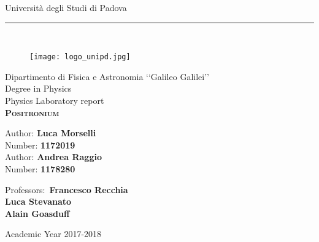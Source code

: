 \begin{titlepage}
	
	\begin{center}
		\LARGE{Università degli Studi di Padova}\\
		\noindent\rule{12cm}{0.4pt}\\
		\begin{figure}[H]
			\centering
			\texttt{[image: logo\_unipd.jpg]}
		\end{figure}
		\vspace{-0.2em}
		\Large{Dipartimento di Fisica e Astronomia ‘‘Galileo Galilei’’}\\
		\vspace{2em}
		\Large{Degree in Physics}\\
		\vspace{2em}
		\normalsize{Physics Laboratory report}\\
		\vspace{3.5em}
		\LARGE{\textsc{\textbf{Positronium}}}\\
		\vspace{3em}
		\begin{flushleft}
			\Large{Author: \textbf{Luca Morselli}}\\
			\Large{Number: \textbf{1172019}}\\
			\vspace{0.5em}
			\Large{Author: \textbf{Andrea Raggio}}\\
			\Large{Number: \textbf{1178280}}
		\end{flushleft}
		\vspace{2em}
	\end{center}
	\begin{flushright}
		\normalsize{Professors:~\textbf{Francesco Recchia\\Luca Stevanato\\ Alain Goasduff}}
	\end{flushright}
	\begin{center}
		\vspace{2.5em}
		\LARGE{Academic Year 2017-2018}\\
	\end{center}
	
\end{titlepage}